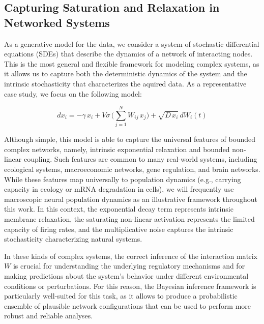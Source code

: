 \documentclass[10pt, aps, rmp,  twocolumn, superscriptaddress, floatfix, showkeys]{revtex4-2}
\begin{document}
\subsection{Capturing Saturation and Relaxation in Networked Systems}



As a generative model for the data, we consider a system of stochastic differential equations (SDEs) that describe the dynamics of a network of interacting nodes. This is the most general and flexible framework for modeling complex systems, as it allows us to capture both the deterministic dynamics of the system and the intrinsic stochasticity that characterizes the aquired data. 
As a representative case study, we focus on the following model:

\begin{equation}
    dx_i = -\gamma \, x_i + V \sigma \, \Bigg(\sum_{j=1}^{N} W_{ij}\, x_j \Bigg) +  \sqrt{D \, x_i} \, dW_i(t)
\end{equation}

Although simple, this model is able to capture the universal features of bounded complex networks, namely, intrinsic exponential relaxation and bounded non-linear coupling. Such features are common to many real-world systems, including ecological systems, macroeconomic networks, gene regulation, and brain networks. While these features map universally to population dynamics (e.g., carrying capacity in ecology or mRNA degradation in cells), we will frequently use macroscopic neural population dynamics as an illustrative framework throughout this work. In this context, the exponential decay term represents intrinsic membrane relaxation, the saturating non-linear activation represents the limited capacity of firing rates, and the multiplicative noise captures the intrinsic stochasticity characterizing natural systems.

In these kinds of complex systems, the correct inference of the interaction matrix $W$ is crucial for understanding the underlying regulatory mechanisms and for making predictions about the system's behavior under different environmental conditions or perturbations. For this reason, the Bayesian inference framework is particularly well-suited for this task, as it allows to produce a probabilistic ensemble of plausible network configurations that can be used to perform more robust and reliable analyses.
\end{document}
